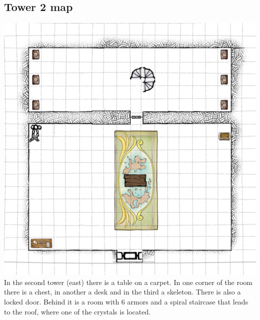 \documentclass[a4paper,10pt,twoside,twocolumn,bg=print]{dndbook} %
\begin{document}
		\subsection{Tower 2 map}
		\includegraphics[width=\linewidth]{Tower2.png}
		\vspace*{4cm}\linebreak
		In the second tower (east) there is a table on a carpet. In one corner of the room there is a chest, in another a desk and in the third a skeleton. There is also a locked door. Behind it is a room with 6 armors and a spiral staircase that leads to the roof, where one of the crystals is located.
		\vfill
		\pagebreak
\end{document}
